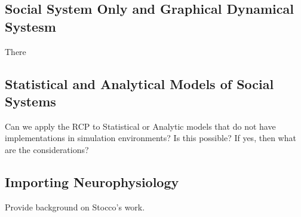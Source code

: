 \documentclass{article}
\begin{document}
\subsection{Social System Only and Graphical Dynamical Systesm}
There 

\subsection{Statistical and Analytical Models of Social Systems}
Can we apply the RCP to Statistical or Analytic models that do not have implementations in simulation environments?  Is this possible?  If yes, then what are the considerations?

\subsection{Importing Neurophysiology}
Provide background on Stocco's work.
\end{document}
